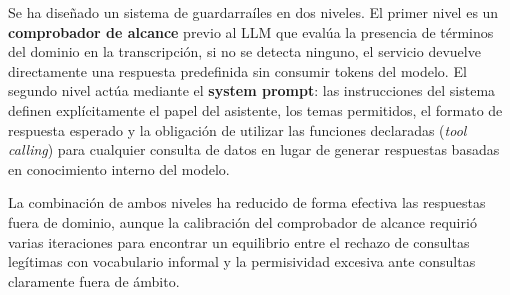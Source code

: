 Se ha diseñado un sistema de guardarraíles en dos niveles. El primer nivel es un
\textbf{comprobador de alcance} previo al LLM que evalúa la presencia de términos del
dominio en la transcripción, si no se detecta ninguno, el servicio devuelve directamente
una respuesta predefinida sin consumir tokens del modelo. El segundo nivel actúa mediante
el \textbf{system prompt}: las instrucciones del sistema definen explícitamente el papel
del asistente, los temas permitidos, el formato de respuesta esperado y la obligación de
utilizar las funciones declaradas (\textit{tool calling}) para cualquier consulta de datos
en lugar de generar respuestas basadas en conocimiento interno del modelo.

La combinación de ambos niveles ha reducido de forma efectiva las respuestas fuera de dominio,
aunque la calibración del comprobador de alcance requirió varias iteraciones para encontrar
un equilibrio entre el rechazo de consultas legítimas con vocabulario informal y la
permisividad excesiva ante consultas claramente fuera de ámbito.